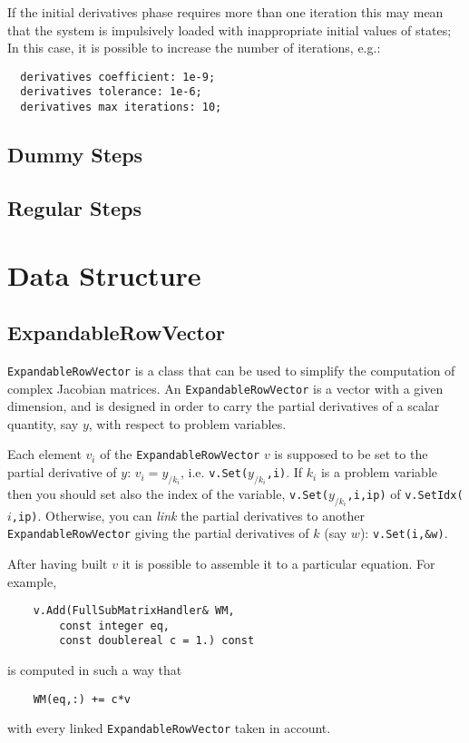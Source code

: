 \documentclass[10pt,dvips,fleqn]{report}
\begin{document}
\noindent
If the initial derivatives phase requires
more than one iteration  
this may mean that
the system is impulsively loaded  with inappropriate 
initial values of states; 
In this case, it is possible to increase the number of iterations, e.g.:
\begin{verbatim}
  derivatives coefficient: 1e-9;
  derivatives tolerance: 1e-6;
  derivatives max iterations: 10; 
\end{verbatim}
\section{Dummy Steps}
\section{Regular Steps}

\chapter{Data Structure}
\section{ExpandableRowVector}
\texttt{ExpandableRowVector} is a class that can be used to
simplify the computation of complex Jacobian matrices.
An \texttt{ExpandableRowVector} is a vector with a given dimension,
and is designed in order to carry the partial derivatives
of a scalar quantity, say $y$, with respect to problem variables.

\noindent
Each element $v_i$ of the \texttt{ExpandableRowVector} $v$ 
is supposed to be set to the partial derivative
of $y$: $v_i = y_{/k_i}$, i.e. \texttt{v.Set($y_{/k_i}$,i)}.
If $k_i$ is a problem variable then you should set also
the index of the variable, \texttt{v.Set($y_{/k_i}$,i,ip)}
of \texttt{v.SetIdx($i$,ip)}. Otherwise, you can
\emph{link} the partial derivatives to another \texttt{ExpandableRowVector}
giving the partial derivatives of $k$ (say $w$): \texttt{v.Set(i,\&w)}.

\noindent
After having built $v$ it is possible to assemble it 
to a particular equation. For example,
\begin{verbatim}
    v.Add(FullSubMatrixHandler& WM,
        const integer eq,
        const doublereal c = 1.) const
\end{verbatim}
is computed in such a way that
\begin{verbatim}
    WM(eq,:) += c*v
\end{verbatim}
with every linked \texttt{ExpandableRowVector} taken in account.
\end{document}
